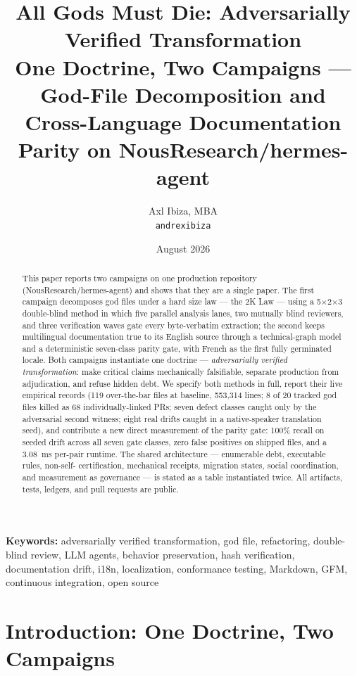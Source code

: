 \documentclass[11pt]{article}
\title{All Gods Must Die: Adversarially Verified Transformation\\
\large One Doctrine, Two Campaigns --- God-File Decomposition and\\
Cross-Language Documentation Parity on NousResearch/hermes-agent}
\author{Axl Ibiza, MBA\\
\texttt{andrexibiza}}
\date{August 2026}
\theoremstyle{definition}
\theoremstyle{plain}
\theoremstyle{remark}
\newcommand{\keywords}[1]{\par\smallskip\noindent\textbf{Keywords:} #1}
\begin{document}
\maketitle

\begin{abstract}
This paper reports two campaigns on one production repository
(NousResearch/hermes-agent) and shows that they are a single paper. The
first campaign decomposes god files under a hard size law --- the 2K Law ---
using a 5$\times$2$\times$3 double-blind method in which five parallel
analysis lanes, two mutually blind reviewers, and three verification waves
gate every byte-verbatim extraction; the second keeps multilingual
documentation true to its English source through a technical-graph model and
a deterministic seven-class parity gate, with French as the first fully
germinated locale. Both campaigns instantiate one doctrine ---
\emph{adversarially verified transformation}: make critical claims
mechanically falsifiable, separate production from adjudication, and refuse
hidden debt. We specify both methods in full, report their live empirical
records (119 over-the-bar files at baseline, 553{,}314 lines; 8 of 20
tracked god files killed as 68 individually-linked PRs; seven defect classes
caught only by the adversarial second witness; eight real drifts caught in a
native-speaker translation seed), and contribute a new direct measurement of
the parity gate: 100\% recall on seeded drift across all seven gate classes,
zero false positives on shipped files, and a 3.08~ms per-pair runtime. The
shared architecture --- enumerable debt, executable rules, non-self-
certification, mechanical receipts, migration states, social coordination,
and measurement as governance --- is stated as a table instantiated twice.
All artifacts, tests, ledgers, and pull requests are public.
\end{abstract}
\keywords{adversarially verified transformation, god file, refactoring, double-blind review, LLM agents, behavior preservation, hash verification, documentation drift, i18n, localization, conformance testing, Markdown, GFM, continuous integration, open source}

\tableofcontents
\newpage

\section{Introduction: One Doctrine, Two Campaigns}
\label{sec:intro}
\end{document}
